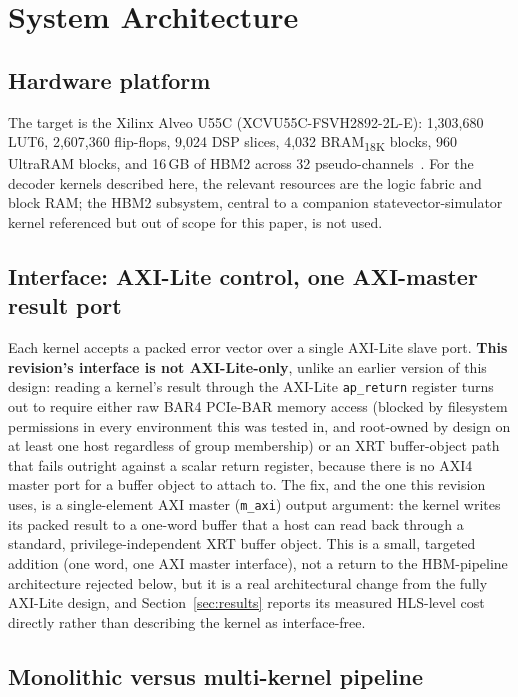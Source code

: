 \section{System Architecture}\label{sec:architecture}

\subsection{Hardware platform}\label{subsec:platform}

The target is the Xilinx Alveo U55C (XCVU55C-FSVH2892-2L-E): 1,303,680 LUT6, 2,607,360 flip-flops, 9,024 DSP slices, 4,032 BRAM\textsubscript{18K} blocks, 960 UltraRAM blocks, and 16\,GB of HBM2 across 32 pseudo-channels~\cite{xilinx2023vitis}. For the decoder kernels described here, the relevant resources are the logic fabric and block RAM; the HBM2 subsystem, central to a companion statevector-simulator kernel referenced but out of scope for this paper, is not used.

\subsection{Interface: AXI-Lite control, one AXI-master result port}\label{subsec:axilite}

Each kernel accepts a packed error vector over a single AXI-Lite slave port. \textbf{This revision's interface is not AXI-Lite-only}, unlike an earlier version of this design: reading a kernel's result through the AXI-Lite \texttt{ap\_return} register turns out to require either raw BAR4 PCIe-BAR memory access (blocked by filesystem permissions in every environment this was tested in, and root-owned by design on at least one host regardless of group membership) or an XRT buffer-object path that fails outright against a scalar return register, because there is no AXI4 master port for a buffer object to attach to. The fix, and the one this revision uses, is a single-element AXI master (\texttt{m\_axi}) output argument: the kernel writes its packed result to a one-word buffer that a host can read back through a standard, privilege-independent XRT buffer object. This is a small, targeted addition (one word, one AXI master interface), not a return to the HBM-pipeline architecture rejected below, but it is a real architectural change from the fully AXI-Lite design, and Section~\ref{sec:results} reports its measured HLS-level cost directly rather than describing the kernel as interface-free.

\subsection{Monolithic versus multi-kernel pipeline}\label{subsec:arch-choice}

